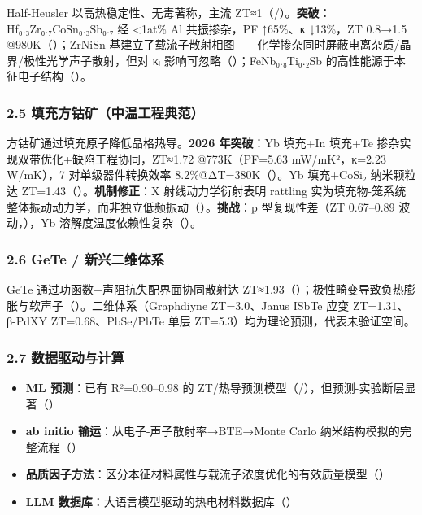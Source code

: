 \documentclass[12pt,a4paper]{ctexart}
\providecommand{\tightlist}{%
  \setlength{\itemsep}{0pt}\setlength{\parskip}{0pt}}
\begin{document}
Half-Heusler 以高热稳定性、无毒著称，主流 ZT≈1（\cite{TE138}/\cite{TE143}）。\textbf{突破}：Hf₀.₃Zr₀.₇CoSn₀.₃Sb₀.₇ 经 \textless1at\% Al 共振掺杂，PF ↑65\%、κ ↓13\%，ZT 0.8→1.5 @980K（\cite{TE146}）；ZrNiSn 基建立了载流子散射相图------化学掺杂同时屏蔽电离杂质/晶界/极性光学声子散射，但对 κₗ 影响可忽略（\cite{TE136}）；FeNb₀.₈Ti₀.₂Sb 的高性能源于本征电子结构（\cite{TE200}）。

\subsubsection{2.5 填充方钴矿（中温工程典范）}\label{ux586bux5145ux65b9ux94b4ux77ffux4e2dux6e29ux5de5ux7a0bux5178ux8303}

方钴矿通过填充原子降低晶格热导。\textbf{2026 年突破}：Yb 填充+In 填充+Te 掺杂实现双带优化+缺陷工程协同，ZT≈1.72 @773K（PF=5.63 mW/mK²，κ=2.23 W/mK），7 对单级器件转换效率 8.2\%@ΔT=380K（\cite{TE040}）。Yb 填充+CoSi₂ 纳米颗粒达 ZT=1.43（\cite{TE039}）。\textbf{机制修正}：X 射线动力学衍射表明 rattling 实为填充物-笼系统整体振动动力学，而非独立低频振动（\cite{TE188}）。\textbf{挑战}：p 型复现性差（ZT 0.67--0.89 波动，\cite{TE048}），Yb 溶解度温度依赖性复杂（\cite{TE035}）。

\subsubsection{2.6 GeTe / 新兴二维体系}\label{gete-ux65b0ux5174ux4e8cux7ef4ux4f53ux7cfb}

GeTe 通过功函数+声阻抗失配界面协同散射达 ZT≈1.93（\cite{TE165}）；极性畸变导致负热膨胀与软声子（\cite{TE163}）。二维体系（Graphdiyne ZT=3.0、Janus ISbTe 应变 ZT=1.31、β-PdXY ZT=0.68、PbSe/PbTe 单层 ZT=5.3）均为理论预测，代表未验证空间。

\subsubsection{2.7 数据驱动与计算}\label{ux6570ux636eux9a71ux52a8ux4e0eux8ba1ux7b97}

\begin{itemize}
\tightlist
\item
  \textbf{ML 预测}：已有 R²=0.90--0.98 的 ZT/热导预测模型（\cite{TE011}/\cite{TE057}），但预测-实验断层显著（\cite{TE057}）
\item
  \textbf{ab initio 输运}：从电子-声子散射率→BTE→Monte Carlo 纳米结构模拟的完整流程（\cite{TE026}）
\item
  \textbf{品质因子方法}：区分本征材料属性与载流子浓度优化的有效质量模型（\cite{TE025}）
\item
  \textbf{LLM 数据库}：大语言模型驱动的热电材料数据库（\cite{TE017}）
\end{itemize}
\end{document}
